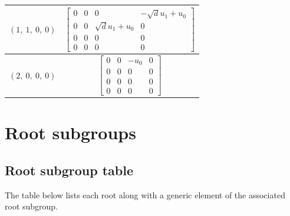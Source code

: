 \documentclass[11pt]{article}
\newcommand{\noi}{\noindent}
\theoremstyle{definition}
\begin{document}
\begin{tabular}{|l|c|}
    \hline
    $\left( 1, \  1, \  0, \  0\right)$ & $\left[\begin{matrix}0 & 0 & 0 & - \sqrt{d} u_{1} + u_{0}\\0 & 0 & \sqrt{d} u_{1} + u_{0} & 0\\0 & 0 & 0 & 0\\0 & 0 & 0 & 0\end{matrix}\right]$ \\
    \hline
    $\left( 2, \  0, \  0, \  0\right)$ & $\left[\begin{matrix}0 & 0 & - u_{0} & 0\\0 & 0 & 0 & 0\\0 & 0 & 0 & 0\\0 & 0 & 0 & 0\end{matrix}\right]$ \\
    \hline
\end{tabular}


\newpage
\section{Root subgroups}

\subsection{Root subgroup table}

\noi The table below lists each root along with a generic element of the associated root subgroup.

\bigskip
\end{document}
